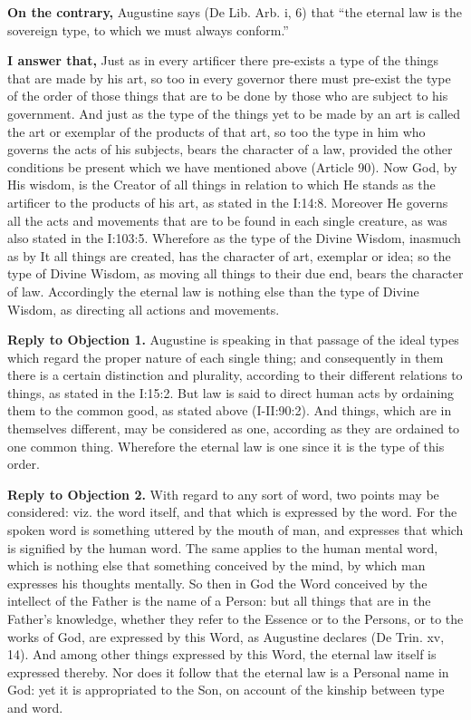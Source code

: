 \textbf{On the contrary,} Augustine says (De Lib. Arb. i, 6) that ``the eternal law is the sovereign type, to which we must always conform.''

\textbf{I answer that,} Just as in every artificer there pre-exists a type of the things that are made by his art, so too in every governor there must pre-exist the type of the order of those things that are to be done by those who are subject to his government. And just as the type of the things yet to be made by an art is called the art or exemplar of the products of that art, so too the type in him who governs the acts of his subjects, bears the character of a law, provided the other conditions be present which we have mentioned above (Article 90). Now God, by His wisdom, is the Creator of all things in relation to which He stands as the artificer to the products of his art, as stated in the I:14:8. Moreover He governs all the acts and movements that are to be found in each single creature, as was also stated in the I:103:5. Wherefore as the type of the Divine Wisdom, inasmuch as by It all things are created, has the character of art, exemplar or idea; so the type of Divine Wisdom, as moving all things to their due end, bears the character of law. Accordingly the eternal law is nothing else than the type of Divine Wisdom, as directing all actions and movements.

\textbf{Reply to Objection 1.} Augustine is speaking in that passage of the ideal types which regard the proper nature of each single thing; and consequently in them there is a certain distinction and plurality, according to their different relations to things, as stated in the I:15:2. But law is said to direct human acts by ordaining them to the common good, as stated above (I-II:90:2). And things, which are in themselves different, may be considered as one, according as they are ordained to one common thing. Wherefore the eternal law is one since it is the type of this order.

\textbf{Reply to Objection 2.} With regard to any sort of word, two points may be considered: viz. the word itself, and that which is expressed by the word. For the spoken word is something uttered by the mouth of man, and expresses that which is signified by the human word. The same applies to the human mental word, which is nothing else that something conceived by the mind, by which man expresses his thoughts mentally. So then in God the Word conceived by the intellect of the Father is the name of a Person: but all things that are in the Father's knowledge, whether they refer to the Essence or to the Persons, or to the works of God, are expressed by this Word, as Augustine declares (De Trin. xv, 14). And among other things expressed by this Word, the eternal law itself is expressed thereby. Nor does it follow that the eternal law is a Personal name in God: yet it is appropriated to the Son, on account of the kinship between type and word.

